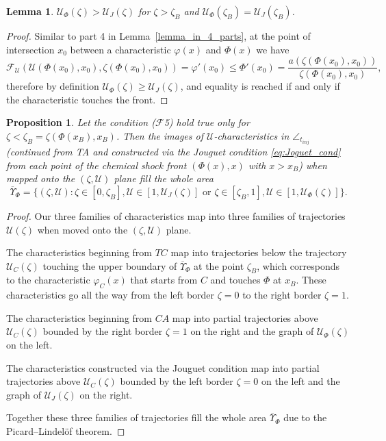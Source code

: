 \documentclass[12pt]{article}
\newtheorem{lemma}{Lemma}
\newtheorem{proposition}{Proposition}
\theoremstyle{definition}
\begin{document}
\begin{lemma}
\label{lemma-U-Phi-above-U-J}
$\mathcal U_\Phi(\zeta) > \mathcal U_J(\zeta)$ for $\zeta > \zeta_B$ and $\mathcal U_\Phi(\zeta_B) = \mathcal U_J(\zeta_B)$.
\end{lemma}
\begin{proof}
Similar to part 4 in Lemma~\ref{lemma_in_4_parts}, at the point of intersection $x_0$ between a characteristic $\varphi(x)$ and $\Phi(x)$ we have
\[
\mathcal F_{\mathcal U}(\mathcal U(\Phi(x_0), x_0), \zeta(\Phi(x_0), x_0)) = \varphi'(x_0) \leqslant \Phi'(x_0) = \dfrac{a(\zeta(\Phi(x_0), x_0))}{\zeta(\Phi(x_0), x_0)},
\]
therefore by definition $\mathcal U_\Phi(\zeta) \geqslant \mathcal U_J(\zeta)$, and equality is reached if and only if the characteristic touches the front.
\end{proof}

\begin{proposition}
Let the condition ($\mathcal F$5) hold true only for $\zeta < \zeta_B = \zeta(\Phi(x_B), x_B)$. Then the images of $\mathcal U$-characteristics in $\angle_{t_{inj}}$ (continued from TA and constructed via the Jouguet condition \eqref{eq:Joguet_cond} from each point of the chemical shock front $(\Phi(x),x)$ with $x > x_B$) when mapped onto the $(\zeta, \mathcal U)$ plane fill the whole area
$$\overline {\Upsilon}_\Phi = \{(\zeta, \mathcal U): \zeta\in[0,\zeta_B], \mathcal U \in [1, \mathcal U_J(\zeta)] \text{ or } \zeta\in[\zeta_B, 1], \mathcal U \in [1, \mathcal U_\Phi(\zeta)]\}.$$
\end{proposition}

\begin{proof}
Our three families of characteristics map into three families of trajectories $\mathcal U(\zeta)$ when moved onto the $(\zeta, \mathcal U)$ plane.

The characteristics beginning from $TC$ map into trajectories below the trajectory $\mathcal U_C(\zeta)$ touching the upper boundary of $\overline\Upsilon_\Phi$ at the point $\zeta_B$, which corresponds to the characteristic $\varphi_C(x)$ that starts from $C$ and touches $\Phi$ at $x_B$. These characteristics go all the way from the left border $\zeta=0$ to the right border $\zeta=1$.

The characteristics beginning from $CA$ map into partial trajectories above $\mathcal U_C(\zeta)$ bounded by the right border $\zeta=1$ on the right and the graph of $\mathcal U_\Phi(\zeta)$ on the left.

The characteristics constructed via the Jouguet condition map into partial trajectories above $\mathcal U_C(\zeta)$ bounded by the left border $\zeta=0$ on the left and the graph of $\mathcal U_J(\zeta)$ on the right.

Together these three families of trajectories fill the whole area $\overline {\Upsilon}_\Phi$ due to the Picard--Lindel\"of theorem.
\end{proof}
\end{document}
